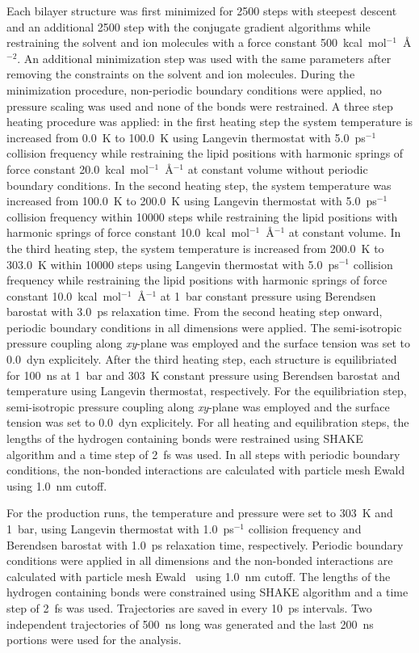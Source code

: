 \documentclass[journal=jpcbfk,manuscript=article]{achemso}
\begin{document}
Each bilayer structure was first minimized for 2500 steps with steepest
descent and an additional 2500 step with the conjugate gradient
algorithms while restraining the solvent and ion molecules with a force
constant 500~kcal~mol$^{-1}$~\AA{}$^{-2}$. An additional minimization
step was used with the same parameters after removing the constraints on
the solvent and ion molecules. During the minimization procedure,
non-periodic boundary conditions were applied, no pressure scaling was
used and none of the bonds were restrained. A three step heating
procedure was applied: in the first heating step the system temperature
is increased from 0.0~K to 100.0~K using Langevin thermostat with
5.0~ps$^{-1}$ collision frequency while restraining the lipid positions
with harmonic springs of force constant
20.0~kcal~mol$^{-1}$~\AA{}$^{-1}$ at constant volume without periodic
boundary conditions. In the second heating step, the system temperature
was increased from 100.0~K to 200.0~K using Langevin thermostat with
5.0~ps$^{-1}$ collision frequency within 10000 steps while restraining
the lipid positions with harmonic springs of force constant
10.0~kcal~mol$^{-1}$~\AA{}$^{-1}$ at constant volume. In the third
heating step, the system temperature is increased from 200.0~K to
303.0~K within 10000 steps using Langevin thermostat with 5.0~ps$^{-1}$
collision frequency while restraining the lipid positions with harmonic
springs of force constant 10.0~kcal~mol$^{-1}$~\AA{}$^{-1}$ at 1~bar
constant pressure using Berendsen barostat with 3.0~ps relaxation time.
From the second heating step onward, periodic boundary conditions in all
dimensions were applied. The semi-isotropic pressure coupling along
\textit{xy}-plane was employed and the surface tension was set to
0.0~dyn explicitely. After the third heating step, each structure is
equilibriated for 100~ns at 1~bar and 303~K constant pressure using
Berendsen barostat and temperature using Langevin thermostat,
respectively. For the equilibriation step, semi-isotropic pressure
coupling along \textit{xy}-plane was employed and the surface tension
was set to 0.0~dyn explicitely. For all heating and equilibration steps,
the lengths of the hydrogen containing bonds were restrained using SHAKE
algorithm and a time step of 2~fs was used. In all steps with periodic
boundary conditions, the non-bonded interactions are calculated with
particle mesh Ewald~\cite{essman95} using 1.0~nm cutoff.

For the production runs, the temperature and pressure were set to 303~K
and 1~bar, using Langevin thermostat with 1.0~ps$^{-1}$ collision
frequency and Berendsen barostat with 1.0~ps relaxation time,
respectively. Periodic boundary conditions were applied in all
dimensions and the non-bonded interactions are calculated with particle
mesh Ewald~\cite{essman95} using 1.0~nm cutoff. The lengths of the
hydrogen containing bonds were constrained using SHAKE algorithm and a
time step of 2~fs was used. Trajectories are saved in every 10~ps
intervals. Two independent trajectories of 500~ns long was generated and
the last 200~ns portions were used for the analysis.
\end{document}
